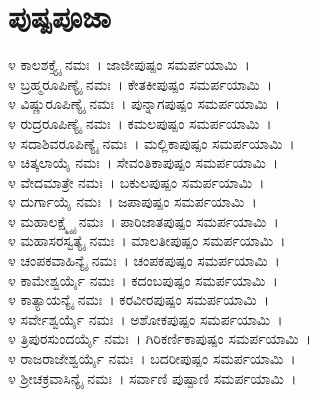 \section{ಪುಷ್ಪಪೂಜಾ}
೪ ಕಾಲಶಕ್ತ್ಯೈ ನಮಃ~। ಜಾಜೀಪುಷ್ಪಂ ಸಮರ್ಪಯಾಮಿ~।\\
೪ ಬ್ರಹ್ಮರೂಪಿಣ್ಯೈ ನಮಃ~। ಕೇತಕೀಪುಷ್ಪಂ ಸಮರ್ಪಯಾಮಿ~।\\
೪ ವಿಷ್ಣುರೂಪಿಣ್ಯೈ ನಮಃ~। ಪುನ್ನಾಗಪುಷ್ಪಂ ಸಮರ್ಪಯಾಮಿ~।\\
೪ ರುದ್ರರೂಪಿಣ್ಯೈ ನಮಃ~। ಕಮಲಪುಷ್ಪಂ ಸಮರ್ಪಯಾಮಿ~।\\
೪ ಸದಾಶಿವರೂಪಿಣ್ಯೈ ನಮಃ~। ಮಲ್ಲಿಕಾಪುಷ್ಪಂ ಸಮರ್ಪಯಾಮಿ~।\\
೪ ಚಿತ್ಕಲಾಯೈ ನಮಃ~। ಸೇವಂತಿಕಾಪುಷ್ಪಂ ಸಮರ್ಪಯಾಮಿ~।\\
೪ ವೇದಮಾತ್ರೇ ನಮಃ~। ಬಕುಲಪುಷ್ಪಂ ಸಮರ್ಪಯಾಮಿ~।\\
೪ ದುರ್ಗಾಯೈ ನಮಃ~। ಜಪಾಪುಷ್ಪಂ ಸಮರ್ಪಯಾಮಿ~।\\
೪ ಮಹಾಲಕ್ಷ್ಮ್ಯೈ ನಮಃ~। ಪಾರಿಜಾತಪುಷ್ಪಂ ಸಮರ್ಪಯಾಮಿ~।\\
೪ ಮಹಾಸರಸ್ವತ್ಯೈ ನಮಃ~। ಮಾಲತೀಪುಷ್ಪಂ ಸಮರ್ಪಯಾಮಿ~।\\
೪ ಚಂಪಕವಾಹಿನ್ಯೈ ನಮಃ~। ಚಂಪಕಪುಷ್ಪಂ ಸಮರ್ಪಯಾಮಿ~।\\
೪ ಕಾಮೇಶ್ವರ್ಯೈ ನಮಃ~। ಕದಂಬಪುಷ್ಪಂ ಸಮರ್ಪಯಾಮಿ~।\\
೪ ಕಾತ್ಯಾಯನ್ಯೈ ನಮಃ~। ಕರವೀರಪುಷ್ಪಂ ಸಮರ್ಪಯಾಮಿ~।\\
೪ ಸರ್ವೇಶ್ವರ್ಯೈ ನಮಃ~। ಅಶೋಕಪುಷ್ಪಂ ಸಮರ್ಪಯಾಮಿ~।\\
೪ ತ್ರಿಪುರಸುಂದರ್ಯೈ ನಮಃ~। ಗಿರಿಕರ್ಣಿಕಾಪುಷ್ಪಂ ಸಮರ್ಪಯಾಮಿ~।\\
೪ ರಾಜರಾಜೇಶ್ವರ್ಯೈ ನಮಃ~। ಬದರೀಪುಷ್ಪಂ ಸಮರ್ಪಯಾಮಿ~।\\
೪ ಶ್ರೀಚಕ್ರವಾಸಿನ್ಯೈ ನಮಃ~। ಸರ್ವಾಣಿ ಪುಷ್ಪಾಣಿ ಸಮರ್ಪಯಾಮಿ~।

